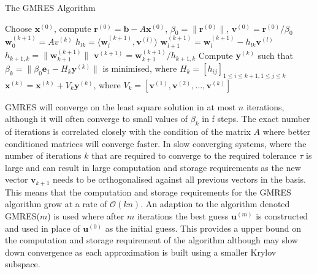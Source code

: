 \begin{algorithm}
\caption{The GMRES Algorithm}\label{alg:GMRES}
\begin{algorithmic}[1]
\State Choose $\bm{x}^{(0)}$, compute $\bm{r}^{(0)}=\bm{b}-A\bm{x}^{(0)}$, $\beta_0 = \lVert \bm{r}^{(0)} \rVert$, $\bm{v}^{(0)} = \bm{r}^{(0)}/\beta_0$
\State $\bm{w}_0^{(k+1)} = Av^{(k)}$
\State $h_{lk}=\langle \bm{w}_l^{(k+1)}, \bm{v}^{(l)} \rangle$
\State $\bm{w}_{l+1}^{(k+1)} = \bm{w}_l^{(k+1)} - h_{lk}\bm{v}^{(l)}$
\EndFor
\State $h_{k+1,k}=\lVert \bm{w}_{k+1}^{(k+1)} \rVert$
\State $\bm{v}^{(k+1)} = \bm{w}_{k+1}^{(k+1)}/h_{k+1,k}$
\State Compute $\bm{y}^{(k)}$ such that $\beta_k = \lVert \beta_0 \bm{e}_1 - H_k  \bm{y}^{(k)} \rVert$ is minimised, where
\State $H_k = [h_{ij}]_{1 \leq i \leq k+1, 1 \leq j \leq k}$
\EndFor
\State $\bm{x}^{(k)} = \bm{x}^{(k)} + V_k\bm{y}^{(k)}$, where $V_k = [\bm{v}^{(1)},\bm{v}^{(2)},\dots,\bm{v}^{(k)}]$
\end{algorithmic}
\end{algorithm}

GMRES will converge on the least square solution in at most $n$ iterations, although it will often converge to small values of $\beta_k$ in f steps. The exact number of iterations is correlated closely with the  condition of the matrix $A$ where better conditioned matrices will converge faster. In slow converging systems, where the number of iterations $k$ that are required to converge to the required tolerance $\tau$ is large and can result in large computation and storage requirements as the new vector $\bm{v}_{k+1}$ needs to be orthogonalised against all previous vectors in the basis. This means that the computation and storage requirements for the GMRES algorithm grow at a rate of $\mathcal{O}(kn)$. An adaption to the algorithm denoted GMRES($m$) is used where after $m$ iterations the best guess $\bm{u}^{(m)}$ is constructed and used in place of $\bm{u}^{(0)}$ as the initial guess. This provides a upper bound on the computation and storage requirement of the algorithm although may slow down convergence as each approximation is built using a smaller Krylov subspace.

\FloatBarrier
